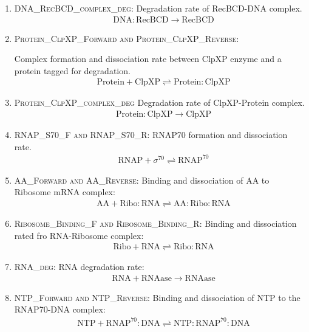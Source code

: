 \documentclass[english]{report}
\begin{document}
\begin{enumerate}
        	
        	\item \textsc{DNA\_RecBCD\_complex\_deg}: 
        	Degradation rate of RecBCD-DNA complex. 
        	\begin{align}
        	& \mathrm{DNA:RecBCD} \rightarrow  \mathrm{RecBCD} 
        	\end{align}
        	
        	\item \textsc{Protein\_ClpXP\_Forward and Protein\_ClpXP\_Reverse}: 
        	
        	Complex formation and dissociation rate between ClpXP enzyme and a protein tagged for degradation.
        	\begin{align}
        	& \mathrm{Protein} + \mathrm{ClpXP} \rightleftharpoons  \mathrm{Protein:ClpXP} 
        	\end{align}        	
        	\item \textsc{Protein\_ClpXP\_complex\_deg} 
        	Degradation rate of ClpXP-Protein complex.
        	\begin{align}
        	& \mathrm{Protein:ClpXP}  \rightarrow   \mathrm{ClpXP}
        	\end{align} 
        	\item \textsc{RNAP\_S70\_F and RNAP\_S70\_R}:
        	RNAP70 formation and dissociation rate.
        	\begin{align}
        	& \mathrm{RNAP} + \sigma^{70} \rightleftharpoons   \mathrm{RNAP^{70}}
        	\end{align}
        	\item \textsc{AA\_Forward and AA\_Reverse}:
        	Binding and dissociation of AA to Ribosome mRNA complex:
        	\begin{align}
        	& \mathrm{AA} + \mathrm{Ribo:RNA}  \rightleftharpoons   \mathrm{AA}:\mathrm{Ribo:RNA}
        	\end{align}
        	\item \textsc{Ribosome\_Binding\_F and Ribosome\_Binding\_R}: Binding and dissociation rated fro RNA-Ribosome complex:
        	\begin{align}
        	& \mathrm{Ribo} + \mathrm{RNA}  \rightleftharpoons   \mathrm{Ribo:RNA}
        	\end{align}
        	\item \textsc{RNA\_deg}: RNA degradation rate:
        	\begin{align}
        	& \mathrm{RNA} + \mathrm{RNAase}  \rightarrow   \mathrm{RNAase}
        	\end{align}
        	
        	\item \textsc{NTP\_Forward and NTP\_Reverse}:
        	Binding and dissociation of NTP to the RNAP70-DNA complex:
        	\begin{align}
        	& \mathrm{NTP} + \mathrm{RNAP^{70}}:\mathrm{DNA}  \rightleftharpoons   \mathrm{NTP}:\mathrm{RNAP^{70}}:\mathrm{DNA}
        	\end{align}
			\end{enumerate}		
\end{document}
